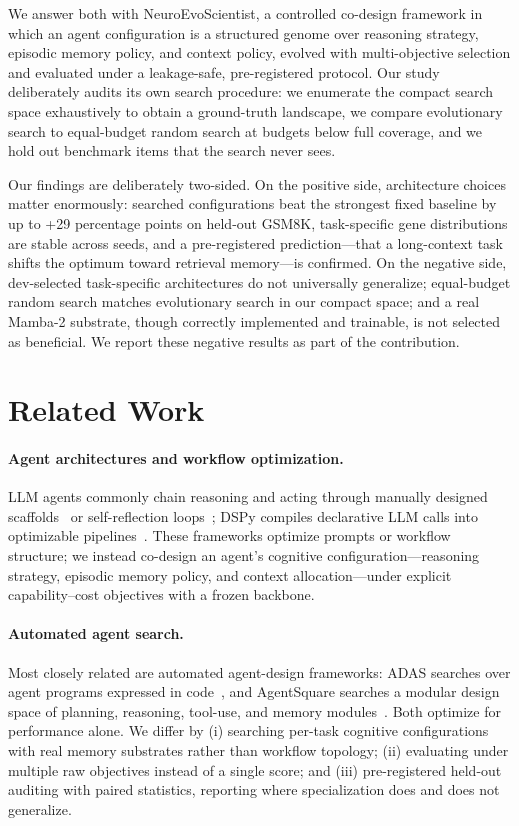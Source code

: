 \documentclass[11pt]{article}
\begin{document}
We answer both with NeuroEvoScientist, a controlled co-design framework in
which an agent configuration is a structured genome over reasoning strategy,
episodic memory policy, and context policy, evolved with multi-objective
selection and evaluated under a leakage-safe, pre-registered protocol. Our
study deliberately audits its own search procedure: we enumerate the compact
search space exhaustively to obtain a ground-truth landscape, we compare
evolutionary search to equal-budget random search at budgets below full
coverage, and we hold out benchmark items that the search never sees.

Our findings are deliberately two-sided. On the positive side, architecture
choices matter enormously: searched configurations beat the strongest fixed
baseline by up to +29 percentage points on held-out GSM8K, task-specific
gene distributions are stable across seeds, and a pre-registered
prediction---that a long-context task shifts the optimum toward retrieval
memory---is confirmed. On the negative side, dev-selected task-specific
architectures do not universally generalize; equal-budget random search
matches evolutionary search in our compact space; and a real Mamba-2
substrate, though correctly implemented and trainable, is not selected as
beneficial. We report these negative results as part of the contribution.

\section{Related Work}

\paragraph{Agent architectures and workflow optimization.}
LLM agents commonly chain reasoning and acting through manually designed
scaffolds~\citep{yao2023react,schick2023toolformer} or self-reflection
loops~\citep{shinn2023reflexion}; DSPy compiles declarative LLM calls into
optimizable pipelines~\citep{khattab2023dspy}. These frameworks optimize
prompts or workflow structure; we instead co-design an agent's cognitive
configuration---reasoning strategy, episodic memory policy, and context
allocation---under explicit capability--cost objectives with a frozen
backbone.

\paragraph{Automated agent search.}
Most closely related are automated agent-design frameworks: ADAS searches
over agent programs expressed in code~\citep{hu2024adas}, and AgentSquare
searches a modular design space of planning, reasoning, tool-use, and memory
modules~\citep{shang2025agentsquare}. Both optimize for performance alone.
We differ by (i) searching per-task cognitive configurations with real
memory substrates rather than workflow topology; (ii) evaluating under
multiple raw objectives instead of a single score; and (iii) pre-registered
held-out auditing with paired statistics, reporting where specialization
does and does not generalize.
\end{document}

